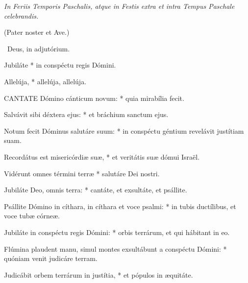 


\textit{In Feriis Temporis Paschalis, atque in Festis extra et intra Tempus Paschale celebrandis.}

(Pater noster et Ave.)

\V\ Deus, in adjutórium.


 Jubiláte * in conspéctu regis Dómini.


 Allelúja, * allelúja, allelúja.


\lettrine[lines=2]{C}{ANTATE} Dómino cánticum novum: * quia mirabília fecit.

Salvávit sibi déxtera ejus: * et bráchium sanctum ejus.

Notum fecit Dóminus salutáre suum: * in conspéctu géntium revelávit justítiam suam.

Recordátus est misericórdiæ suæ, * et veritátis suæ dómui Israël.

Vidérunt omnes términi terræ * salutáre Dei nostri.

Jubiláte Deo, omnis terra: * cantáte, et exsultáte, et psállite.

Psállite Dómino in cíthara, in cíthara et voce psalmi: * in tubis ductílibus, et voce tubæ córneæ.

Jubiláte in conspéctu regis Dómini: * orbis terrárum, et qui hábitant in eo.

Flúmina plaudent manu, simul montes exsultábunt a conspéctu Dómini: * quóniam venit judicáre terram.

Judicábit orbem terrárum in justítia, * et pópulos in æquitáte.

